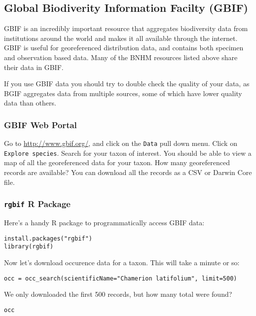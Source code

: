 \documentclass[11pt]{article}
\begin{document}
\subsection{Global Biodiverity Information Facilty (GBIF)}

GBIF is an incredibly important resource that aggregates
biodiversity data from institutions around the world
and makes it all available through the internet.
GBIF is useful for georeferenced distribution data,
and contains both specimen and observation based data.
Many of the BNHM resources listed above share their data
in GBIF.

If you use GBIF data you should try to double check the quality of your data,
as BGIF aggregates data from multiple sources, some of which have lower quality data
than others.

\subsubsection{GBIF Web Portal}

Go to \url{http://www.gbif.org/}, and click on the 
\texttt{Data} pull down menu. Click on \texttt{Explore species}.
Search for your taxon of interest.
You should be able to view a map of all the georeferenced data
for your taxon.
How many georeferenced records are available?
You can download all the records as a CSV or Darwin Core file.

\subsubsection{\texttt{rgbif} R Package}

Here's a handy R package to programmatically access GBIF data:

\begin{verbatim}
install.packages("rgbif")
library(rgbif)
\end{verbatim}

Now let's download occurence data for a taxon.
This will take a minute or so:

\begin{verbatim}
occ = occ_search(scientificName="Chamerion latifolium", limit=500)
\end{verbatim}

We only downloaded the first 500 records, but how many total were found?

\begin{verbatim}
occ
\end{verbatim}
\end{document}
